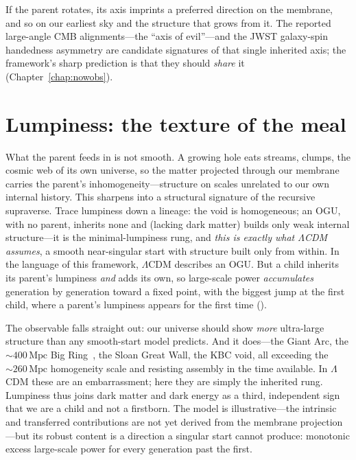 If the parent rotates, its axis imprints a preferred direction on the membrane,
and so on our earliest sky and the structure that grows from it. The reported
large-angle CMB alignments---the ``axis of evil''---and the JWST galaxy-spin
handedness asymmetry are candidate signatures of that single inherited axis; the
framework's sharp prediction is that they should \emph{share} it
(Chapter~\ref{chap:nowobs}).

\section{Lumpiness: the texture of the meal}
\label{sec:lumpiness}

What the parent feeds in is not smooth. A growing hole eats streams, clumps, the
cosmic web of its own universe, so the matter projected through our membrane
carries the parent's inhomogeneity---structure on scales unrelated to our own
internal history. This sharpens into a structural signature of the recursive
supraverse. Trace lumpiness down a lineage: the void is homogeneous; an OGU, with
no parent, inherits none and (lacking dark matter) builds only weak internal
structure---it is the minimal-lumpiness rung, and \emph{this is exactly what
$\Lambda$CDM assumes}, a smooth near-singular start with structure built only from
within. In the language of this framework, $\Lambda$CDM describes an OGU. But a
child inherits its parent's lumpiness \emph{and} adds its own, so large-scale power
\emph{accumulates} generation by generation toward a fixed point, with the biggest
jump at the first child, where a parent's lumpiness appears for the first time
().

The observable falls straight out: our universe should show \emph{more}
ultra-large structure than any smooth-start model predicts. And it does---the
Giant Arc, the $\sim\!400\,\mathrm{Mpc}$ Big Ring~\citep{lopez2024bigring}, the
Sloan Great Wall, the KBC void, all exceeding the $\sim\!260\,\mathrm{Mpc}$
homogeneity scale and resisting assembly in the time available. In $\Lambda$CDM
these are an embarrassment; here they are simply the inherited rung. Lumpiness thus
joins dark matter and dark energy as a third, independent sign that we are a child
and not a firstborn. The model is illustrative---the intrinsic and transferred
contributions are not yet derived from the membrane projection---but its robust
content is a direction a singular start cannot produce: monotonic excess
large-scale power for every generation past the first.

